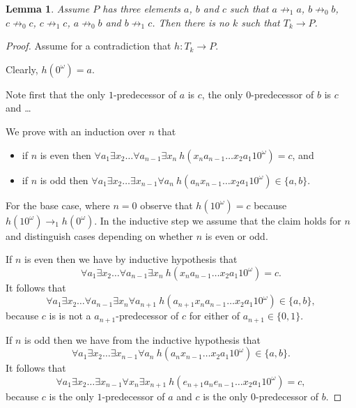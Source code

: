 \documentclass[a4paper]{article}
\newtheorem{lemma}[theorem]{Lemma}
\begin{document}
\begin{lemma} \label{first killer lemma}
 Assume $P$ has three elements $a$, $b$ and $c$ such that $a \not
\rightarrow_1 a$, $b \not \rightarrow_0 b$, $c \not \rightarrow_0 c$,
$c \not \rightarrow_1 c$, $a \not \rightarrow_0 b$ and $b \not
\rightarrow_1 c$. Then there is no $k$ such that $T_k \to P$.
\end{lemma}
\begin{proof}
 Assume for a contradiction that $h : T_k \to P$.

Clearly, $h(0^\omega) = a$.

Note first that the only $1$-predecessor of $a$ is $c$, the only
$0$-predecessor of $b$ is $c$ and \dots

\medskip

We prove with an induction over $n$ that
\begin{itemize}
 \item if $n$ is even then $\forall a_1 \exists x_2 \dots
\forall a_{n - 1} \exists x_n \  h(x_n a_{n - 1} \dots x_2 a_1 1 0^\omega) = c$,
and
 \item if $n$ is odd then $\forall a_1 \exists x_2
\dots \exists x_{n - 1} \forall a_n \  h(a_n x_{n - 1}\dots
x_2 a_1 1 0^\omega) \in \{a, b\}$.
\end{itemize}
For the base case, where $n = 0$ observe that $h(10^\omega) = c$ because
$h(10^\omega) \rightarrow_1 h(0^\omega)$. In the inductive step we
assume that the claim holds for $n$ and distinguish cases depending on
whether $n$ is even or odd.

If $n$ is even then we have by inductive hypothesis that
\[
 \forall a_1 \exists x_2 \dots \forall a_{n - 1} \exists x_n \  h(x_n
a_{n - 1} \dots x_2 a_1 1 0^\omega) = c.
\]
It follows that
\[
 \forall a_1 \exists x_2 \dots \forall a_{n - 1} \exists x_n \forall
a_{n + 1} \ h(a_{n + 1} x_n
a_{n - 1} \dots x_2 a_1 1 0^\omega) \in \{a,b\},
\]
because $c$ is is not a $a_{n + 1}$-predecessor of $c$ for either of
$a_{n + 1} \in \{0,1\}$.

If $n$ is odd then we have from the inductive hypothesis that
\[
\forall a_1 \exists x_2
\dots \exists x_{n - 1} \forall a_n \  h(a_n x_{n - 1}\dots
x_2 a_1 1 0^\omega) \in \{a, b\}.
\]
It follows that
\[
 \forall a_1 \exists x_2 \dots \exists x_{n - 1} \forall x_n \exists
x_{n + 1} \ h(e_{n + 1} a_n
e_{n - 1} \dots x_2 a_1 1 0^\omega) = c,
\]
because $c$ is the only $1$-predecessor of $a$ and $c$ is the only
$0$-predecessor of $b$.

\medskip


\end{proof}
\end{document}
